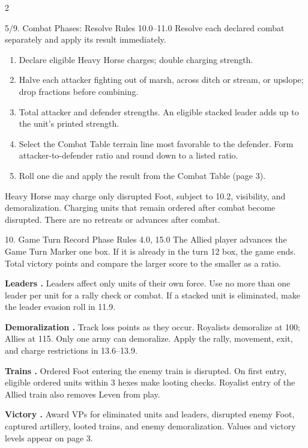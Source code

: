 \begin{multicols}{2}
\begin{aidbox}{5/9. Combat Phases: Resolve \hfill \normalfont\small Rules 10.0--11.0}
Resolve each declared combat separately and apply its result immediately.
\begin{enumerate}[label=\textbf{\arabic*.}]
  \item Declare eligible Heavy Horse charges; double charging strength.
  \item Halve each attacker fighting out of marsh, across ditch or stream, or upslope; drop fractions before combining.
  \item Total attacker and defender strengths. An eligible stacked leader adds up to the unit's printed strength.
  \item Select the Combat Table terrain line most favorable to the defender. Form attacker-to-defender ratio and round down to a listed ratio.
  \item Roll one die and apply the result from the Combat Table (page 3).
\end{enumerate}
Heavy Horse may charge only disrupted Foot, subject to 10.2, visibility, and demoralization. Charging units that remain ordered after combat become disrupted. There are no retreats or advances after combat.
\end{aidbox}

\begin{aidbox}{10. Game Turn Record Phase \hfill \normalfont\small Rules 4.0, 15.0}
The Allied player advances the Game Turn Marker one box. If it is already in the turn 12 box, the game ends. Total victory points and compare the larger score to the smaller as a ratio.
\end{aidbox}

\textbf{Leaders .} Leaders affect only units of their own force. Use no more than one leader per unit for a rally check or combat. If a stacked unit is eliminated, make the leader evasion roll in 11.9.

\textbf{Demoralization .} Track loss points as they occur. Royalists demoralize at 100; Allies at 115. Only one army can demoralize. Apply the rally, movement, exit, and charge restrictions in 13.6--13.9.

\textbf{Trains .} Ordered Foot entering the enemy train is disrupted. On first entry, eligible ordered units within 3 hexes make looting checks. Royalist entry of the Allied train also removes Leven from play.

\textbf{Victory .} Award VPs for eliminated units and leaders, disrupted enemy Foot, captured artillery, looted trains, and enemy demoralization. Values and victory levels appear on page 3.

\end{multicols}
\endgroup
